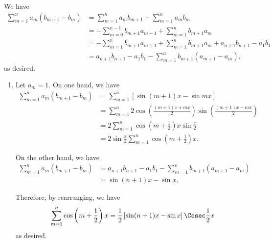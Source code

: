 \Question{\currfilebase}

We have
\begin{align*}
    \sum_{m = 1}^{n} a_m (b_{m + 1} - b_m) &= \sum_{m = 1}^{n} a_m b_{m + 1} - \sum_{m = 1}^{n} a_m b_m\\
    &= -\sum_{m = 0}^{n - 1} b_{m + 1} a_{m + 1} + \sum_{m = 1}^{n} b_{m + 1} a_m\\
    &= -\sum_{m = 1}^{n} b_{m + 1} a_{m + 1} + \sum_{m = 1}^{n} b_{m + 1} a_m + a_{n + 1} b_{n + 1} - a_1 b_1\\
    &= a_{n + 1} b_{n + 1} - a_1 b_1 - \sum_{m = 1}^{n} b_{m + 1}(a_{m + 1} - a_m),
\end{align*}
as desired.

\begin{enumerate}
    \item Let \(a_m = 1\). On one hand, we have
    \begin{align*}
        \sum_{m = 1}^{n} a_m (b_{m + 1} - b_m) &= \sum_{m = 1}^{n} \left[\sin(m + 1) x - \sin mx\right]\\
        &= \sum_{m = 1}^{n} 2 \cos \left(\frac{(m + 1)x + mx}{2}\right) \sin \left(\frac{(m + 1)x - mx}{2}\right)\\
        &= 2 \sum_{m = 1}^{n} \cos \left(m + \frac{1}{2}\right)x \sin \frac{x}{2}\\
        &= 2 \sin \frac{x}{2} \sum_{m = 1}^{n} \cos \left(m + \frac{1}{2}\right)x.
    \end{align*}

    On the other hand, we have
    \begin{align*}
        \sum_{m = 1}^{n} a_m (b_{m + 1} - b_m) &= a_{n + 1} b_{n + 1} - a_1 b_1 - \sum_{m = 1}^{n} b_{m + 1} (a_{m + 1} - a_m)\\
        &= \sin (n + 1) x - \sin x.
    \end{align*}

    Therefore, by rearranging, we have
    \[
        \sum_{m = 1}^{n} \cos \left(m + \frac{1}{2}\right)x = \frac{1}{2} \left[\sin(n + 1)x - \sin x\right] \Cosec \frac{1}{2} x
    \]
    as desired.


\end{enumerate}
